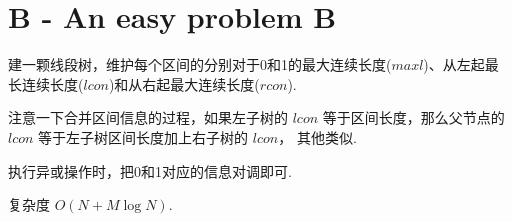 \documentclass{ctexart}
\begin{document}
\section*{B - An easy problem B}

建一颗线段树，维护每个区间的分别对于0和1的最大连续长度($maxl$)、从左起最长连续长度($lcon$)和从右起最大连续长度($rcon$).

注意一下合并区间信息的过程，如果左子树的 $lcon$ 等于区间长度，那么父节点的 $lcon$ 等于左子树区间长度加上右子树的 $lcon$，
其他类似.

执行异或操作时，把0和1对应的信息对调即可.

复杂度 $O(N+M\log{N})$.
\end{document}
